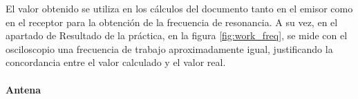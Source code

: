 El valor obtenido se utiliza en los c\'alculos del documento tanto en el emisor como en el receptor para la obtenci\'on de la frecuencia de resonancia. A su vez, en el apartado de Resultado de la pr\'actica, en la figura \ref{fig:work_freq}, se mide con el osciloscopio una frecuencia de trabajo aproximadamente igual, justificando la concordancia entre el valor calculado y el valor real.


\paragraph{Antena}
